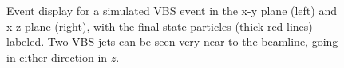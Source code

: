 \begin{figure}[htb]
    \centering
    \qquad
    \caption[Event display for a simulated VBS \WH event]{
        Event display for a simulated VBS \WH event in the x-y plane (left) and x-z plane (right), with the final-state particles (thick red lines) labeled. 
        Two VBS jets can be seen very near to the beamline, going in either direction in $z$. 
    }
    \label{fig:vbswh_fireworks}
\end{figure}

